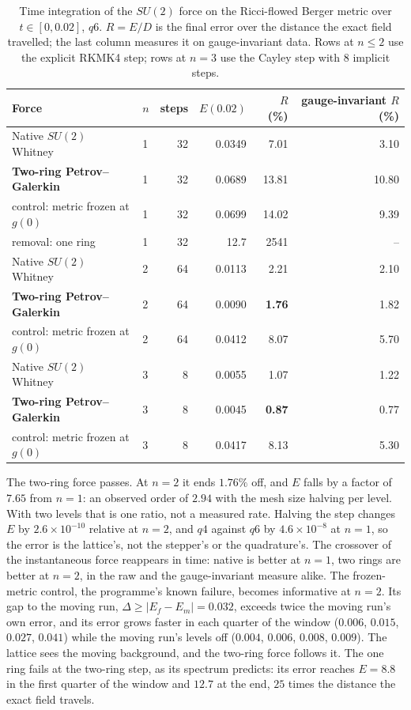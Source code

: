 \documentclass[11pt]{article}
\theoremstyle{definition}
\theoremstyle{remark}
\begin{document}
\begin{table}[t]\centering\small
\caption{Time integration of the $SU(2)$ force on the Ricci-flowed Berger metric over
$t\in[0,0.02]$, $q6$. $R=E/D$ is the final error over the distance the exact field
travelled; the last column measures it on gauge-invariant data. Rows at $n\le2$ use the
explicit RKMK4 step; rows at $n=3$ use the Cayley step with $8$ implicit steps.}
\label{tab:su2flow}
\begin{tabular}{llrrrr}\toprule
Force & $n$ & steps & $E(0.02)$ & $R$ (\%) & gauge-invariant $R$ (\%) \\ \midrule
Native $SU(2)$ Whitney & 1 & 32 & 0.0349 & 7.01 & 3.10 \\
\textbf{Two-ring Petrov--Galerkin} & 1 & 32 & 0.0689 & 13.81 & 10.80 \\
control: metric frozen at $g(0)$ & 1 & 32 & 0.0699 & 14.02 & 9.39 \\
removal: one ring & 1 & 32 & 12.7 & 2541 & -- \\ \midrule
Native $SU(2)$ Whitney & 2 & 64 & 0.0113 & 2.21 & 2.10 \\
\textbf{Two-ring Petrov--Galerkin} & 2 & 64 & 0.0090 & \textbf{1.76} & 1.82 \\
control: metric frozen at $g(0)$ & 2 & 64 & 0.0412 & 8.07 & 5.70 \\ \midrule
Native $SU(2)$ Whitney & 3 & 8 & 0.0055 & 1.07 & 1.22 \\
\textbf{Two-ring Petrov--Galerkin} & 3 & 8 & 0.0045 & \textbf{0.87} & 0.77 \\
control: metric frozen at $g(0)$ & 3 & 8 & 0.0417 & 8.13 & 5.30 \\
\bottomrule\end{tabular}
\end{table}

The two-ring force passes. At $n=2$ it ends $1.76\%$ off, and $E$ falls by a factor of
$7.65$ from $n=1$: an observed order of $2.94$ with the mesh size halving per level. With
two levels that is one ratio, not a measured rate. Halving the step changes $E$ by
$2.6\times10^{-10}$ relative at $n=2$, and $q4$ against $q6$ by $4.6\times10^{-8}$ at $n=1$,
so the error is the lattice's, not the stepper's or the quadrature's. The crossover of the
instantaneous force reappears in time: native is better at $n=1$, two rings are better at
$n=2$, in the raw and the gauge-invariant measure alike. The frozen-metric control, the
programme's known failure, becomes informative at $n=2$. Its gap to the moving run,
$\Delta\ge|E_f-E_m|=0.032$, exceeds twice the moving run's own error, and its error grows
faster in each quarter of the window ($0.006$, $0.015$, $0.027$, $0.041$) while the
moving run's levels off ($0.004$, $0.006$, $0.008$, $0.009$). The lattice sees the moving
background, and the two-ring force follows it. The one ring fails at the two-ring step, as
its spectrum predicts: its error reaches $E=8.8$ in the first quarter of the window and
$12.7$ at the end, $25$ times the distance the exact field travels.
\end{document}
